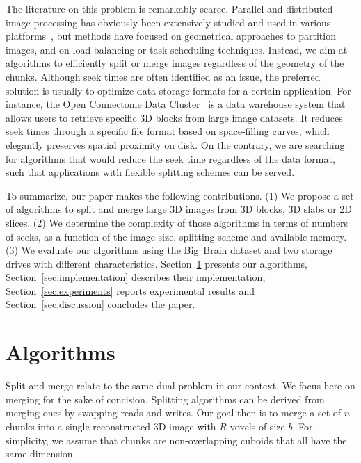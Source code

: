 \documentclass[10pt, conference, compsocconf]{IEEEtran}
\begin{document}
The literature on this problem is remarkably scarce. Parallel and
distributed image processing has obviously been extensively studied
and used in various
platforms~\cite{miguet1991elastic,tang2007eman2,yang2008parallel,braunl2013parallel,moise2013terabyte,bajcsy2013terabyte},
but methods have focused on geometrical approaches to partition images,
and on load-balancing or task scheduling techniques. Instead, we
aim at algorithms to efficiently split or merge images regardless of
the geometry of the chunks. Although seek times are often
identified as an issue, the preferred solution is usually to optimize
data storage formats for a certain application.  For instance, the
Open Connectome Data Cluster~\cite{burns2013open} is a data warehouse
system that allows users to retrieve specific 3D blocks from large
image datasets. It reduces seek times through a specific file format
based on space-filling curves, which elegantly preserves spatial
proximity on disk. On the contrary, we are searching for algorithms
that would reduce the seek time regardless of the data format, such that
applications with flexible splitting schemes can be served.

To summarize, our paper makes the following contributions. (1) We
propose a set of algorithms to split and merge large 3D images from 3D
blocks, 3D slabs or 2D slices. (2) We determine the complexity of those
algorithms in terms of numbers of seeks, as a function of the image
size, splitting scheme and available memory. (3) We evaluate our
algorithms using the Big~Brain dataset and two storage drives with
different characteristics.  Section~\ref{sec:algos} presents our
algorithms, Section~\ref{sec:implementation} describes their
implementation, Section~\ref{sec:experiments} reports experimental
results and Section~\ref{sec:discussion} concludes the paper.


\section{Algorithms}
\label{sec:algos}

Split and merge relate to the same dual problem in our context. We
focus here on merging for the sake of concision. Splitting algorithms
can be derived from merging ones by swapping reads and writes. Our
goal then is to merge a set of $n$ chunks into a single reconstructed
3D image with $R$ voxels of size $b$. For simplicity, we assume that
chunks are non-overlapping cuboids that all have the same dimension.
\end{document}
